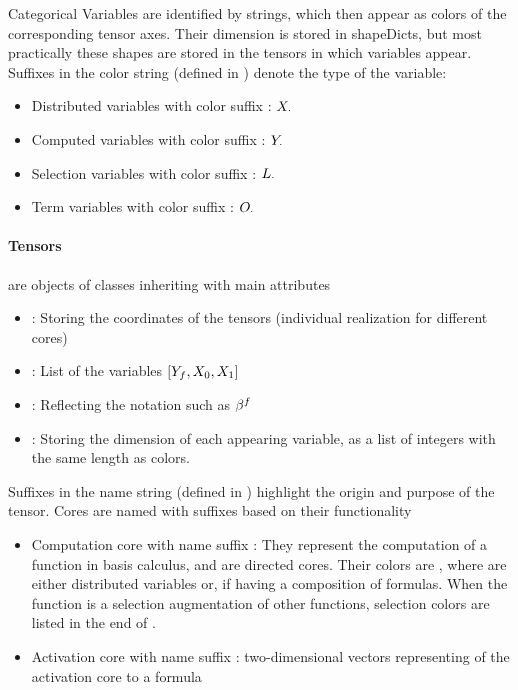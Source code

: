 \subsect{\bncategoricals}
Categorical Variables are identified by strings, which then appear as colors of the corresponding tensor axes.
Their dimension is stored in shapeDicts, but most practically these shapes are stored in the tensors in which variables appear.
Suffixes in the color string (defined in ) denote the type of the variable:
\begin{itemize}
    \item Distributed variables with color suffix \disVarSuf: $X_{\cdot}$
    \item Computed variables with color suffix \comVarSuf: $Y_{\cdot}$
    \item Selection variables with color suffix \selVarSuf: $L_{\cdot}$
    \item Term variables with color suffix \terVarSuf: $O_{\cdot}$
\end{itemize}

\subsect{\bntensors}

\paragraph{Tensors} are objects of classes inheriting  with main attributes
\begin{itemize}
    \item {}: Storing the coordinates of the tensors (individual realization for different cores)
    \item {}: List of the variables $[Y_{f},X_{0},X_{1}]$
    \item {}: Reflecting the notation such as $\beta^{f}$
    \item {}: Storing the dimension of each appearing variable, as a list of integers with the same length as colors.
\end{itemize}

Suffixes in the name string (defined in ) highlight the origin and purpose of the tensor.
Cores are named with suffixes based on their functionality
\begin{itemize}
    \item Computation core with name suffix \comCoreSuf: They represent the computation of a function in basis calculus, and are directed cores.
    Their colors are \inlinecode{[headColors] + [inputColors]}, where \inlinecode{[inputColors]} are either distributed variables or, if having a composition of formulas.
    When the function is a selection augmentation of other functions, selection colors are listed in the end of \inlinecode{[inputColors]}.
    \item Activation core with name suffix \actCoreSuf: two-dimensional vectors representing of the activation core to a formula
\end{itemize}

